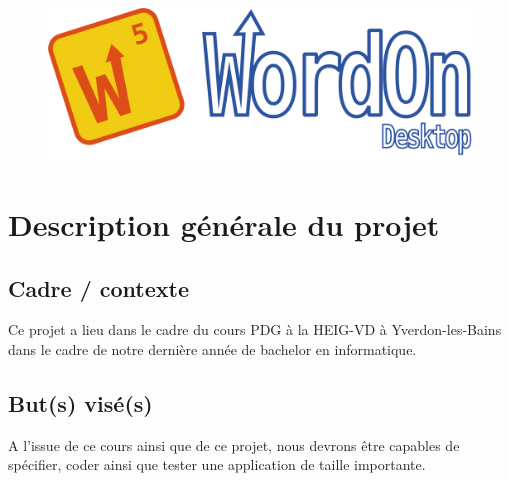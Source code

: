 \documentclass[a4paper,12pt]{article}
\author{\auteur}
\title{\titre}
\date{\today}
\begin{document}
	\clearpage
	\maketitle
	\thispagestyle{empty}
	
	\maketitle
	\begin{figure}[h!]
		\centering
		\includegraphics[scale=1]{logo/logo.png}
	\end{figure}
	\newpage
	
	
	\tableofcontents
	
	\listoffigures
	
	
	\newpage
	
	\section{Description générale du projet}
	\subsection{Cadre / contexte}
	Ce projet a lieu dans le cadre du cours PDG à la HEIG-VD à Yverdon-les-Bains dans le cadre de notre dernière année de bachelor en informatique.
	
	\subsection{But(s) visé(s)}
	A l'issue de ce cours ainsi que de ce projet, nous devrons être capables de spécifier, coder ainsi que tester une application de taille importante.
	
\end{document}
